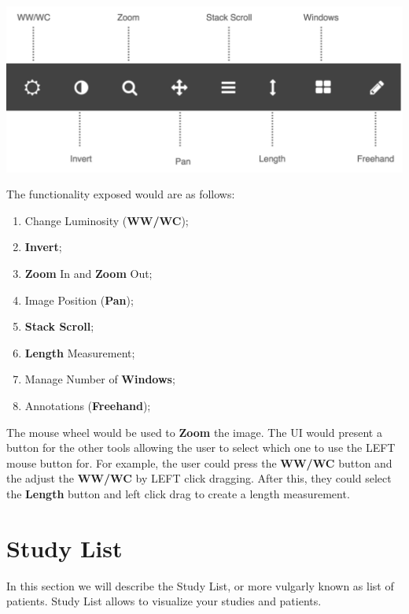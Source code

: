 \documentclass{tufte-book} %
\begin{document}
\hfill

\begin{center}
\includegraphics[width=\textwidth]{graphics/tools.png}
\end{center}

\hfill

The functionality exposed would are as follows:

\hfill

\begin{enumerate}
\item Change Luminosity (\textbf{WW/WC});
\item \textbf{Invert};
\item \textbf{Zoom} In and \textbf{Zoom} Out;
\item Image Position (\textbf{Pan});
\item \textbf{Stack Scroll};
\item \textbf{Length} Measurement;
\item Manage Number of \textbf{Windows};
\item Annotations (\textbf{Freehand});
\end{enumerate}

\hfill

The mouse wheel would be used to \textbf{Zoom} the image. The UI would present a button for the other tools allowing the user to select which one to use the LEFT mouse button for. For example, the user could press the \textbf{WW/WC} button and the adjust the \textbf{WW/WC} by LEFT click dragging. After this, they could select the \textbf{Length} button and left click drag to create a length measurement.

\chapter{Study List}

In this section we will describe the Study List, or more vulgarly known as list of patients. Study List allows to visualize your studies and patients.
\end{document}
